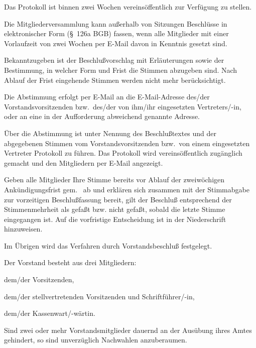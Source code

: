 \documentclass[draft]{scrartcl}
\begin{document}
\begin{contract}
Das Protokoll ist binnen zwei Wochen vereinsöffentlich zur Verfügung zu
stellen.


Die Mitgliederversammlung kann außerhalb von Sitzungen Beschlüsse in
elektronischer Form (§~126a BGB) fassen, wenn alle Mitglieder mit einer
Vorlaufzeit von zwei Wochen per E-Mail davon in Kenntnis gesetzt
sind.\label{eBeschluss}

Bekanntzugeben ist der Beschlußvorschlag mit Erläuterungen sowie der
Bestimmung, in welcher Form und Frist die Stimmen abzugeben sind. Nach Ablauf
der Frist eingehende Stimmen werden nicht mehr berücksichtigt.

Die Abstimmung erfolgt per E-Mail an die E-Mail-Adresse des/der
Vorstandsvorsitzenden bzw.\ des/der von ihm/ihr eingesetzten Vertreters/-in,
oder an eine in der Auf\/forderung abweichend genannte Adresse.

Über die Abstimmung ist unter Nennung des Beschlußtextes und der abgegebenen
Stimmen vom Vorstandsvorsitzenden bzw.\ von einem eingesetzten Vertreter
Protokoll zu führen. Das Protokoll wird vereinsöffentlich zugänglich gemacht
und den Mitgliedern per E-Mail angezeigt.

Geben alle Mitglieder Ihre Stimme bereits vor Ablauf der zweiwöchigen
An\-kün\-di\-gungs\-frist gem.~ ab und erklären sich
zusammen mit der Stimmabgabe zur vorzeitigen Beschlußfassung bereit, gilt der
Beschluß entsprechend der Stimmenmehrheit als gefaßt bzw. nicht gefaßt, sobald
die letzte Stimme eingegangen ist. Auf die vorfristige Entscheidung ist in der
Niederschrift hinzuweisen.

Im Übrigen wird das Verfahren durch Vorstandsbeschluß festgelegt.


Der Vorstand besteht aus drei Mitgliedern:
\begin{compactenum}[\hspace{2em}1.]
  \item dem/der Vorsitzenden,
  \item dem/der stellvertretenden Vorsitzenden und Schriftführer/-in,
  \item dem/der Kassenwart/-wärtin.
\end{compactenum}

Sind zwei oder mehr Vorstandsmitglieder dauernd an der Ausübung ihres Amtes
gehindert, so sind unverzüglich Nachwahlen anzuberaumen.


\end{contract}
\end{document}
